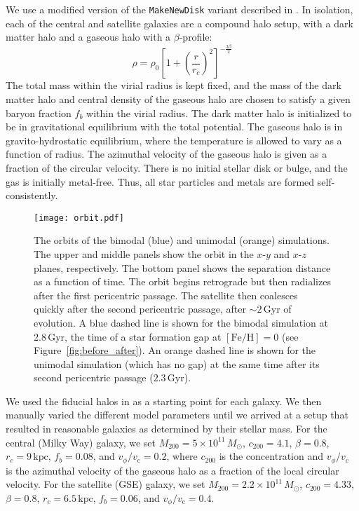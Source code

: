 \documentclass[twocolumn,linenumbers,trackchanges]{aastex631}
\newcommand{\Msun}{\ensuremath{M_{\odot}}}
\newcommand{\Gyr}{\ensuremath{\textrm{Gyr}}}
\newcommand{\kpc}{\ensuremath{\textrm{kpc}}}
\newcommand{\FeH}{\ensuremath{[\textrm{Fe}/\textrm{H}]}}
\begin{document}
We use a modified version of the \texttt{MakeNewDisk} variant described in \citet{2023MNRAS.tmp.2070B}. In isolation, each of the central and satellite galaxies are a compound halo setup, with a \citet{1990ApJ...356..359H} dark matter halo and a gaseous halo with a $\beta$-profile:
\begin{equation*}
\rho = \rho_0 \left[1 + \left(\frac{r}{r_c}\right)^2\right]^{-\frac{3\beta}{2}}
\end{equation*}
The total mass within the virial radius is kept fixed, and the mass of the dark matter halo and central density of the gaseous halo are chosen to satisfy a given baryon fraction $f_b$ within the virial radius. The dark matter halo is initialized to be in gravitational equilibrium with the total potential. The gaseous halo is in gravito-hydrostatic equilibrium, where the temperature is allowed to vary as a function of radius. The azimuthal velocity of the gaseous halo is given as a fraction of the circular velocity. There is no initial stellar disk or bulge, and the gas is initially metal-free. Thus, all star particles and metals are formed self-consistently.

\begin{figure}
    \centering
    \texttt{[image: orbit.pdf]}
    \caption{The orbits of the bimodal (blue) and unimodal (orange) simulations. The upper and middle panels show the orbit in the $x$-$y$ and $x$-$z$ planes, respectively. The bottom panel shows the separation distance as a function of time. The orbit begins retrograde but then radializes after the first pericentric passage. The satellite then coalesces quickly after the second pericentric passage, after $\sim2\,\Gyr$ of evolution. A blue dashed line is shown for the bimodal simulation at $2.8\,\Gyr$, the time of a star formation gap at $\FeH=0$ (see Figure~\ref{fig:before_after}). An orange dashed line is shown for the unimodal simulation (which has no gap) at the same time after its second pericentric passage ($2.3\,\Gyr$).}
    \label{fig:orbit}
\end{figure}

We used the fiducial halos in \citet{2021ApJ...923...92N} as a starting point for each galaxy. We then manually varied the different model parameters until we arrived at a setup that resulted in reasonable galaxies as determined by their stellar mass. For the central (Milky Way) galaxy, we set $M_{200}=5\times10^{11}\,\Msun$, $c_{200}=4.1$, $\beta=0.8$, $r_c=9\,\kpc$, $f_b=0.08$, and $v_{\phi}/v_{\textrm{c}}=0.2$, where $c_{200}$ is the concentration and $v_{\phi}/v_{\textrm{c}}$ is the azimuthal velocity of the gaseous halo as a fraction of the local circular velocity. For the satellite (GSE) galaxy, we set $M_{200}=2.2\times10^{11}\,\Msun$, $c_{200}=4.33$, $\beta=0.8$, $r_c=6.5\,\kpc$, $f_b=0.06$, and $v_{\phi}/v_{\textrm{c}}=0.4$.
\end{document}

